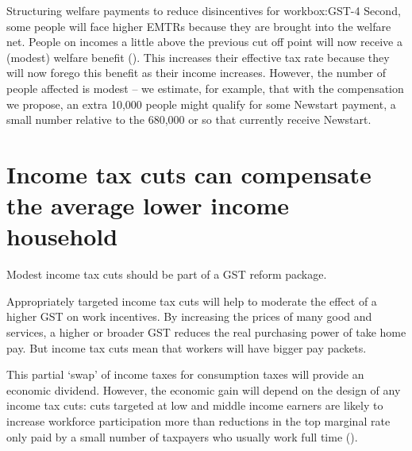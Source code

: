\documentclass{grattanAlpha}
\begin{document}
\begin{bigboxC*}{Structuring welfare payments to reduce disincentives for work}{box:GST-4}
Second, some people will face higher EMTRs because they are brought into the welfare net. People on incomes a little above the previous cut off point will now receive a (modest) welfare benefit (). This increases their effective tax rate because they will now forego this benefit as their income increases. However, the number of people affected is modest – we estimate, for example, that with the compensation we propose, an extra 10,000 people might qualify for some Newstart payment, a small number relative to the 680,000 or so that currently receive Newstart. 


\end{bigboxC*}

\section{Income tax cuts can compensate the average lower income household\label{sec:GST-3-4}}
Modest income tax cuts should be part of a GST reform package.

Appropriately targeted income tax cuts will help to moderate the effect of a higher GST on work incentives. By increasing the prices of many good and services, a higher or broader GST reduces the real purchasing power of take home pay. But income tax cuts mean that workers will have bigger pay packets. 

This partial ‘swap’ of income taxes for consumption taxes will provide an economic dividend. However, the economic gain will depend on the design of any income tax cuts: cuts targeted at low and middle income earners are likely to increase workforce participation more than reductions in the top marginal rate only paid by a small number of taxpayers who usually work full time (). 
\end{document}
